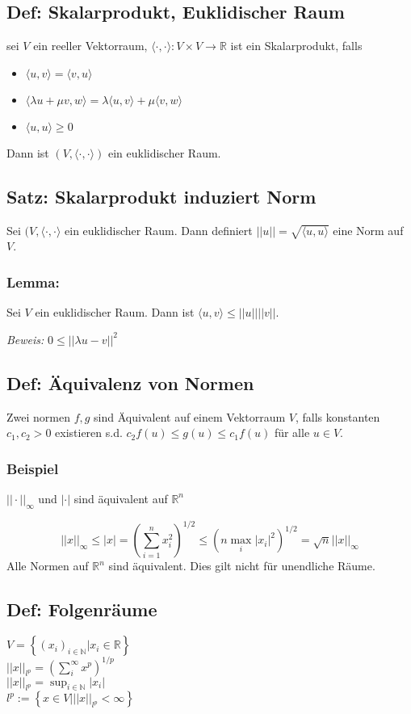 \subsection{Def: Skalarprodukt, Euklidischer Raum}
sei $V$ ein reeller Vektorraum, $\langle \cdot,\cdot\rangle : V\times V\rightarrow \mathbb R$ ist ein Skalarprodukt, falls
\begin{itemize}
	\item $\langle u,v\rangle = \langle v,u\rangle$
	\item $\langle \lambda u + \mu v, w\rangle = \lambda\langle u,v\rangle + \mu\langle v,w\rangle$
	\item $\langle u,u\rangle \geq 0$
\end{itemize}
Dann ist $(V,\langle\cdot,\cdot\rangle)$ ein euklidischer Raum.

\subsection{Satz: Skalarprodukt induziert Norm}
Sei $(V,\langle\cdot,\cdot\rangle$ ein  euklidischer Raum. Dann definiert $||u|| = \sqrt{\langle u,u\rangle}$ eine Norm auf $V$.

\subsubsection{Lemma: }
Sei $V$ ein euklidischer Raum. Dann ist $\langle u,v\rangle \leq ||u||||v||$.

\textit{Beweis: } $0\leq ||\lambda u-v||^2$

\subsection{Def: Äquivalenz von Normen}
Zwei normen $f, g$ sind Äquivalent auf einem Vektorraum $V$, falls konstanten $c_1,c_2>0$ existieren s.d. $c_2 f(u) \leq g(u) \leq c_1 f(u)$ für alle $u\in V$.

\subsubsection{Beispiel}
$||\cdot||_\infty$ und $|\cdot|$ sind äquivalent auf $\mathbb R^n$

$$
||x||_\infty \leq |x| = \left(\sum_{i=1}^n x_i^2\right)^{1/2} \leq \left(n \max_{i}|x_i|^2\right)^{1/2} = \sqrt{n}||x||_\infty
$$
Alle Normen auf $\mathbb R^n$ sind äquivalent. Dies gilt nicht für unendliche Räume.

\subsection{Def: Folgenräume}
$V = \left\{ (x_i)_{i\in\mathbb N} | x_i \in\mathbb R\right\}$\\
$||x||_{l^p} = \left(\sum_i^\infty x^p\right)^{1/p}$\\
$||x||_{l^p} = \sup_{i\in\mathbb N} |x_i|$\\
$l^p := \left\{x\in V| ||x||_{l^p}<\infty\right\}$ 

